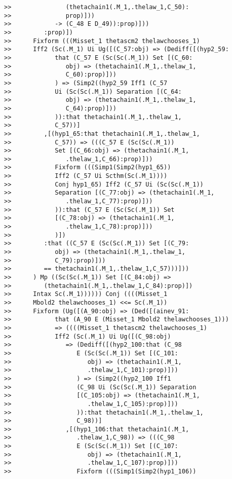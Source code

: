 \documentclass[12pt]{article}
\begin{document}
\begin{verbatim}
>>               (thetachain1(.M_1,.thelaw_1,C_50):
>>               prop)]))
>>            -> (C_48 E D_49)):prop)]))
>>         :prop)])
>>      Fixform (((Misset_1 thetascm2 thelawchooses_1)
>>      Iff2 (Sc(.M_1) Ui Ug([(C_57:obj) => (Dediff([(hyp2_59:
>>            that (C_57 E (Sc(Sc(.M_1)) Set [(C_60:
>>               obj) => (thetachain1(.M_1,.thelaw_1,
>>               C_60):prop)]))
>>            ) => (Simp2((hyp2_59 Iff1 (C_57
>>            Ui (Sc(Sc(.M_1)) Separation [(C_64:
>>               obj) => (thetachain1(.M_1,.thelaw_1,
>>               C_64):prop)]))
>>            )):that thetachain1(.M_1,.thelaw_1,
>>            C_57))]
>>         ,[(hyp1_65:that thetachain1(.M_1,.thelaw_1,
>>            C_57)) => (((C_57 E (Sc(Sc(.M_1))
>>            Set [(C_66:obj) => (thetachain1(.M_1,
>>               .thelaw_1,C_66):prop)]))
>>            Fixform (((Simp1(Simp2(hyp1_65))
>>            Iff2 (C_57 Ui Scthm(Sc(.M_1))))
>>            Conj hyp1_65) Iff2 (C_57 Ui (Sc(Sc(.M_1))
>>            Separation [(C_77:obj) => (thetachain1(.M_1,
>>               .thelaw_1,C_77):prop)]))
>>            )):that (C_57 E (Sc(Sc(.M_1)) Set
>>            [(C_78:obj) => (thetachain1(.M_1,
>>               .thelaw_1,C_78):prop)]))
>>            )])
>>         :that ((C_57 E (Sc(Sc(.M_1)) Set [(C_79:
>>            obj) => (thetachain1(.M_1,.thelaw_1,
>>            C_79):prop)]))
>>         == thetachain1(.M_1,.thelaw_1,C_57)))]))
>>      ) Mp ((Sc(Sc(.M_1)) Set [(C_84:obj) =>
>>         (thetachain1(.M_1,.thelaw_1,C_84):prop)])
>>      Intax Sc(.M_1)))))) Conj ((((Misset_1
>>      Mbold2 thelawchooses_1) <<= Sc(.M_1))
>>      Fixform (Ug([(A_90:obj) => (Ded([(ainev_91:
>>            that (A_90 E (Misset_1 Mbold2 thelawchooses_1)))
>>            => ((((Misset_1 thetascm2 thelawchooses_1)
>>            Iff2 (Sc(.M_1) Ui Ug([(C_98:obj)
>>               => (Dediff([(hyp2_100:that (C_98
>>                  E (Sc(Sc(.M_1)) Set [(C_101:
>>                     obj) => (thetachain1(.M_1,
>>                     .thelaw_1,C_101):prop)]))
>>                  ) => (Simp2((hyp2_100 Iff1
>>                  (C_98 Ui (Sc(Sc(.M_1)) Separation
>>                  [(C_105:obj) => (thetachain1(.M_1,
>>                     .thelaw_1,C_105):prop)]))
>>                  )):that thetachain1(.M_1,.thelaw_1,
>>                  C_98))]
>>               ,[(hyp1_106:that thetachain1(.M_1,
>>                  .thelaw_1,C_98)) => (((C_98
>>                  E (Sc(Sc(.M_1)) Set [(C_107:
>>                     obj) => (thetachain1(.M_1,
>>                     .thelaw_1,C_107):prop)]))
>>                  Fixform (((Simp1(Simp2(hyp1_106))

\end{verbatim}
\end{document}
